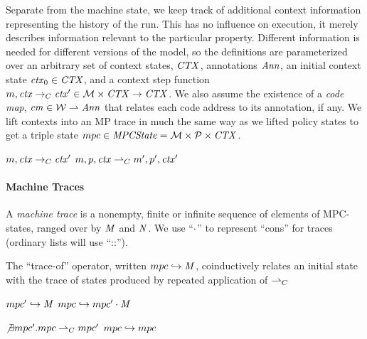 \documentclass[acmsmall,review,anonymous]{acmart}\settopmatter{printfolios=true,printccs=false,printacmref=false}
\begin{document}
{Separate from the machine state, we keep track of additional context
information representing the history of the run. This has no influence on execution, it merely
describes information relevant to the particular property. Different information is needed
for different versions of the model, so the definitions are parameterized
over an arbitrary set of context states, \(\mathit{CTX}\), annotations \(\mathit{Ann}\),
an initial context state \(\mathit{ctx}_0 \in \mathit{CTX}\), and a context step function
\(m, \mathit{ctx} \rightarrow_C \mathit{ctx}' \in {\mathcal M} \times \mathit{CTX}
\rightarrow \mathit{CTX}\). We also assume the existence of a \emph{code map},
\(\mathit{cm} \in {\mathcal W} \rightharpoonup \mathit{Ann}\)
that relates each code address to its annotation, if any.
We lift contexts into an MP trace in much the same way as we lifted policy states to get
a triple state \(mpc \in \mathit{MPCState} = {\mathcal M} \times \mathcal{P} \times
\mathit{CTX}\).

              {\(m, \mathit{ctx} \rightarrow_C \mathit{ctx}'\)}
              {\(m,p,\mathit{ctx} \overset{}{\rightharpoonup}_C
                m',p',\mathit{ctx}'\)}

\paragraph*{Machine Traces}
\label{sec:traces}

A {\em machine trace} is a nonempty, finite or infinite sequence of elements
of MPC-states, ranged over by \(\mathit{M}\) and \(\mathit{N}\).
We use ``\(\cdot\)'' to represent ``cons'' for traces (ordinary lists will use
``::'').

The ``trace-of'' operator, written \(mpc \hookrightarrow \mathit{M}\),
coinductively relates an initial state with the trace of states
produced by repeated application of \(\overset{}{\rightharpoonup}_C\)

\begin{center}
\begin{minipage}{.4\textwidth}
            {\(mpc' \hookrightarrow \mathit{M}\)}
            {\(mpc \hookrightarrow mpc' \cdot \mathit{M}\)}%
\end{minipage}
\begin{minipage}{.4\textwidth}
\judgment%
         {\(\not\exists mpc'. mpc \overset{}{\rightharpoonup}_C mpc'\)}
         {\(mpc \hookrightarrow mpc\)}
\end{minipage}
\end{center}
%

}
\end{document}
